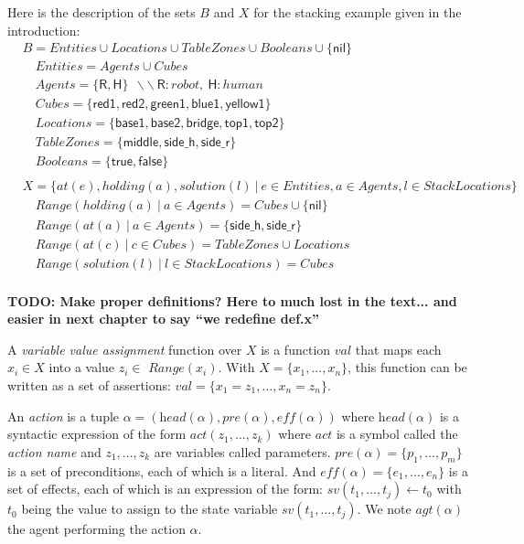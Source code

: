 Here is the description of the sets $B$ and $X$ for the stacking example given in the introduction:
{\small
\begin{align*}
&B           = Entities \cup Locations \cup TableZones \cup Booleans \cup \{\textsf{nil}\} \\
&\quad Entities    = Agents \cup Cubes\\
&\quad Agents      = \{ \textsf{R}, \textsf{H} \} ~~ \backslash\backslash~\textsf{R}:robot,~\textsf{H}:human\\
&\quad Cubes     = \{ \textsf{red1}, \textsf{red2}, \textsf{green1}, \textsf{blue1}, \textsf{yellow1} \}\\
&\quad Locations     = \{ \textsf{base1}, \textsf{base2}, \textsf{bridge}, \textsf{top1}, \textsf{top2} \}\\
&\quad TableZones     = \{ \textsf{middle}, \textsf{side\_h}, \textsf{side\_r} \}\\
&\quad Booleans    = \{ \textsf{true},\textsf{false} \}\\
&\\
&X = \{ at(e), holding(a), solution(l) ~ | ~ e \in Entities, a \in Agents, l \in StackLocations\}\\
&\quad \textit{Range}(holding(a) ~|~ a \in Agents) = Cubes \cup \{\textsf{nil}\} \\
&\quad \textit{Range}(at(a) ~|~ a \in Agents) = \{ \textsf{side\_h}, \textsf{side\_r} \}\\
&\quad \textit{Range}(at(c) ~|~ c \in Cubes) = TableZones \cup Locations\\
&\quad \textit{Range}(solution(l) ~|~ l \in StackLocations) = Cubes \\
\end{align*}
}


\textbf{TODO: Make proper definitions? Here to much lost in the text... and easier in next chapter to say ``we redefine def.x''}

A \textit{variable value assignment} function over $X$ is a function $val$ that maps each $x_i \in X$ into a value $z_i \in$ $\textit{Range}(x_i)$. With $X = \{ x_1, ..., x_n \}$, this function can be written as a set of assertions: $val = \{ x_1=z_1, \ldots, x_n=z_n \}$. 

An \textit{action} is a tuple $\alpha = (\textit{head}(\alpha), \textit{pre}(\alpha), \textit{eff}(\alpha))$ where $\textit{head}(\alpha)$ is a syntactic expression of the form $\textit{act}(z_1, ..., z_k)$ where $act$ is a symbol called the \textit{action name} and $z_1,...,z_k$ are variables called parameters. $\textit{pre}(\alpha) = \{ p_1, ..., p_m \}$ is a set of preconditions, each of which is a literal. And $\textit{eff}(\alpha) = \{ e_1, ..., e_n \}$ is a set of effects, each of which is an expression of the form: $sv(t_1, ..., t_j) \leftarrow t_0$ with $t_0$ being the value to assign to the state variable $sv(t_1, ..., t_j)$. We note $\textit{agt}(\alpha)$ the agent performing the action $\alpha$.

